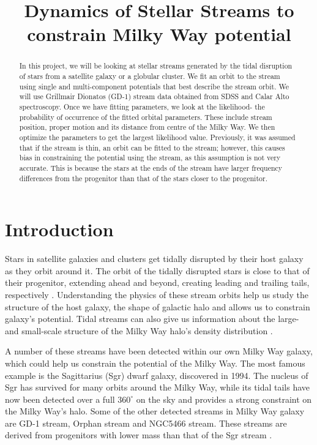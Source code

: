 \documentclass[preprint]{aastex}
\title{Dynamics of Stellar Streams to constrain Milky Way potential}
\affil{\small {Anita Bahmanyar}}
\affil{\small {Supervised by: Prof. Jo Bovy}}
\date{}
\begin{document}
\begin{abstract}
In this project, we will be looking at stellar streams generated by the tidal disruption of stars from a satellite galaxy or a globular cluster.
We fit an orbit to the stream using single and multi-component potentials that best describe the stream orbit. We will use Grillmair Dionatos (GD-1) stream data obtained from SDSS and Calar Alto spectroscopy. Once we have fitting parameters, we look at the likelihood- the probability of occurrence of the fitted orbital parameters. These include stream position, proper motion and its distance from centre of the Milky Way. We then optimize the parameters to get the largest likelihood value. Previously, it was assumed that if the stream is thin, an orbit can be fitted to the stream; however, this causes bias in constraining the potential using the stream, as this assumption is not  very accurate. This is because the stars at the ends of the stream have larger frequency differences from the progenitor than that of the stars closer to the progenitor.
\end{abstract}

\maketitle

\section{Introduction}
Stars in satellite galaxies and clusters get tidally disrupted by their host galaxy as they orbit around it. The orbit of the tidally disrupted stars is close to that of their progenitor, extending ahead and beyond, creating leading and trailing tails, respectively \citep{Bowden2015}. Understanding the physics of these stream orbits help us study the structure of the host galaxy, the shape of galactic halo and allows us to constrain galaxy's potential. Tidal streams can also give us information about the large- and small-scale structure of the Milky Way halo's density distribution \citep{Bovy2014}.

A number of these streams have been detected within our own Milky Way galaxy, which could help us constrain the potential of the Milky Way. The most famous example is the Sagittarius (Sgr) dwarf galaxy, discovered in 1994. \citep{Ibata1994} The nucleus of Sgr has survived for many orbits around the Milky Way, while its tidal tails have now been detected over a full $360^{\circ}$ on the sky and provides a strong constraint on the Milky Way's halo. \citep{Fellhauer2006} 
Some of the other detected streams in Milky Way galaxy are GD-1 stream, Orphan stream and NGC5466 stream. 
These streams are derived from progenitors with lower mass than that of the Sgr stream \citep{Bowden2015}.
\end{document}

